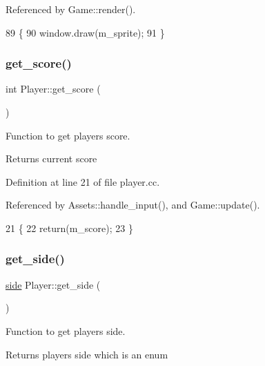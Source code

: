 Referenced by Game\+::render().


\begin{DoxyCode}
89                                         \{
90     window.draw(m\_sprite);
91 \}
\end{DoxyCode}
\mbox{\label{class_player_ad65c379a083e7c6656721616f8784059}} 
\subsubsection{\texorpdfstring{get\+\_\+score()}{get\_score()}}
{\footnotesize\ttfamily int Player\+::get\+\_\+score (\begin{DoxyParamCaption}{ }\end{DoxyParamCaption})}



Function to get player\textquotesingle{}s score. 

\begin{DoxyReturn}{Returns}
current score 
\end{DoxyReturn}


Definition at line 21 of file player.\+cc.



Referenced by Assets\+::handle\+\_\+input(), and Game\+::update().


\begin{DoxyCode}
21                       \{
22     \textcolor{keywordflow}{return}(m\_score);
23 \}
\end{DoxyCode}
\mbox{\label{class_player_a6a10c68a1185ab336054868306fa3a73}} 
\subsubsection{\texorpdfstring{get\+\_\+side()}{get\_side()}}
{\footnotesize\ttfamily \hyperlink{assets_8h_afc015eff6557e84151d2e53b94375445}{side} Player\+::get\+\_\+side (\begin{DoxyParamCaption}{ }\end{DoxyParamCaption})}



Function to get player\textquotesingle{}s side. 

\begin{DoxyReturn}{Returns}
player\textquotesingle{}s side which is an enum 
\end{DoxyReturn}


